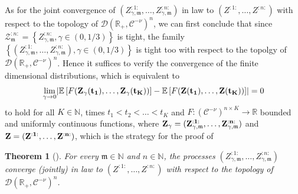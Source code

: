 \documentclass{report}
\newcommand{\NN}{\mathbb{N}}
\newcommand{\RR}{\mathbb{R}}
\DeclarePairedDelimiter\abs{\lvert}{\rvert} %
\newcommand{\Exp}[1]{\mathbb{E}\left[#1\right]}
\newtheorem{theorem}{Theorem}[chapter]
\theoremstyle{remark}
\theoremstyle{definition}
\begin{document}
As for the joint convergence of $(Z_{\gamma, \mathfrak{m}}^{:1:}, \ldots, Z_{\gamma, \mathfrak{m}}^{:n:})$ in law to $(Z^{:1:}, \ldots, Z^{:n:})$ with respect to the topology of $\mathcal{D}(\mathbb{R}_+, \mathcal{C}^{-\nu})^n$, we can first conclude that since $\mathcal{Z}^{:n:}_\mathfrak{m} = \left\{Z_{\gamma, \mathfrak{m}}^{:n:}, \gamma \in (0, 1/3)\right\}$ is tight, the family $\left\{(Z_{\gamma, \mathfrak{m}}^{:1:}, \ldots, Z_{\gamma, \mathfrak{m}}^{:n:}), \gamma \in (0, 1/3)\right\}$ is tight too with respect to the topolgy of $\mathcal{D}(\mathbb{R}_+, \mathcal{C}^{-\nu})^n$. Hence it suffices to verify the convergence of the finite dimensional distributions, which is equivalent to 
\begin{align*}
  \lim_{\gamma \to 0}\abs{\Exp{F(\bf{Z_\gamma(t_1), \ldots, Z_\gamma(t_K)})} - \Exp{F(\bf{Z(t_1), \ldots, Z(t_K)})}} = 0
\end{align*}
to hold for all $K \in \NN$, times $t_1 < t_2 < \ldots < t_K$ and $F: (\mathcal{C}^{-\nu})^{n \times K} \to \mathbb{R}$ bounded and uniformly continuous functions, where $\bf{Z}_\gamma = (Z^{:1:}_{\gamma, \mathfrak{m}}, \ldots, Z^{:n:}_{\gamma, \mathfrak{m}} )$ and $\bf{Z} = (Z^{:1:}, \ldots, Z^{:n:} )$, which is the strategy for the proof of 
\begin{theorem}[{\cite[Theorem 6.2]{mourrat2015convergencetwodimensionaldynamicisingkac}}]
  For every $\mathfrak{m} \in \NN$ and $n \in \NN$, the processes $(Z^{:1:}_{\gamma, \mathfrak{m}}, \ldots, Z^{:n:}_{\gamma, \mathfrak{m}} )$ converge (jointly) in law to $(Z^{:1:}, \ldots, Z^{:n:} )$ with respect to the topology of $\mathcal{D}(\RR_+, \mathcal{C}^{-\nu})^n$.
\end{theorem}
\end{document}
